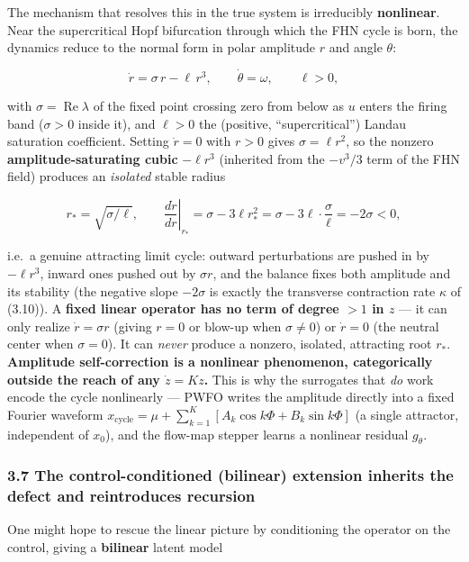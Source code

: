 \documentclass[
  11pt,
]{article}
\providecommand{\lt}{<}
\providecommand{\gt}{>}
\begin{document}
The mechanism that resolves this in the true system is irreducibly
\textbf{nonlinear}. Near the supercritical Hopf bifurcation through
which the FHN cycle is born, the dynamics reduce to the normal form in
polar amplitude \(r\) and angle \(\theta\):

\[
\dot r = \sigma\,r - \ell\,r^{3},
\qquad
\dot\theta = \omega,
\qquad \ell\gt 0,
\tag{3.11}
\]

with \(\sigma=\operatorname{Re}\lambda\) of the fixed point crossing
zero from below as \(u\) enters the firing band (\(\sigma\gt 0\) inside
it), and \(\ell\gt 0\) the (positive, ``supercritical'') Landau
saturation coefficient. Setting \(\dot r=0\) with \(r\gt 0\) gives
\(\sigma=\ell r^2\), so the nonzero \textbf{amplitude-saturating cubic}
\(-\ell r^3\) (inherited from the \(-v^3/3\) term of the FHN field)
produces an \emph{isolated} stable radius

\[
r_{*}=\sqrt{\sigma/\ell},\qquad
\left.\frac{d\dot r}{dr}\right|_{r_{*}} = \sigma-3\ell r_{*}^{2} = \sigma-3\ell\cdot\frac{\sigma}{\ell}=-2\sigma\lt 0,
\]

i.e.~a genuine attracting limit cycle: outward perturbations are pushed
in by \(-\ell r^3\), inward ones pushed out by \(\sigma r\), and the
balance fixes both amplitude and its stability (the negative slope
\(-2\sigma\) is exactly the transverse contraction rate \(\kappa\) of
(3.10)). A \textbf{fixed linear operator has no term of degree \(\gt 1\)
in \(z\)} --- it can only realize \(\dot r=\sigma r\) (giving \(r=0\) or
blow-up when \(\sigma\ne0\)) or \(\dot r=0\) (the neutral center when
\(\sigma=0\)). It can \emph{never} produce a nonzero, isolated,
attracting root \(r_*\). \textbf{Amplitude self-correction is a
nonlinear phenomenon, categorically outside the reach of any
\(\dot z=Kz\).} This is why the surrogates that \emph{do} work encode
the cycle nonlinearly --- PWFO writes the amplitude directly into a
fixed Fourier waveform
\(x_{\text{cycle}}=\mu+\sum_{k=1}^{K}[A_k\cos k\Phi+B_k\sin k\Phi]\) (a
single attractor, independent of \(x_0\)), and the flow-map stepper
learns a nonlinear residual \(g_\theta\).

\subsubsection{3.7 The control-conditioned (bilinear) extension inherits
the defect and reintroduces
recursion}\label{the-control-conditioned-bilinear-extension-inherits-the-defect-and-reintroduces-recursion}

One might hope to rescue the linear picture by conditioning the operator
on the control, giving a \textbf{bilinear} latent model
\end{document}

